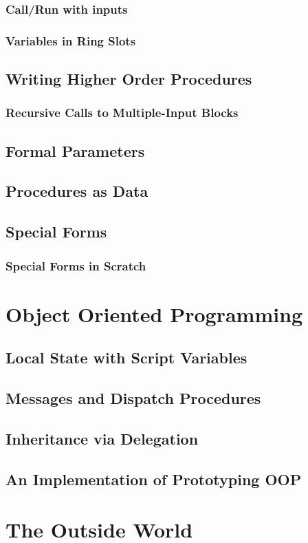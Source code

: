\documentclass{report}
\begin{document}
\subsection{Call/Run with inputs}
\subsection{Variables in Ring Slots}
\section{Writing Higher Order Procedures}
\subsection{Recursive Calls to Multiple-Input Blocks}
\section{Formal Parameters}
\section{Procedures as Data}
\section{Special Forms}
\subsection{Special Forms in Scratch}
\chapter{Object Oriented Programming}
\section{Local State with Script Variables}
\section{Messages and Dispatch Procedures}
\section{Inheritance via Delegation}
\section{An Implementation of Prototyping OOP}
\chapter{The Outside World}
\end{document}
